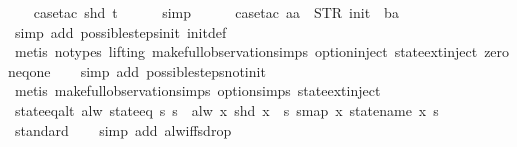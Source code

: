 \begin{isabellebody}
\ \ \isamarkupfalse%
\ {\isacharparenleft}case{\isacharunderscore}tac\ {\isachardoublequoteopen}shd\ t{\isachardoublequoteclose}{\isacharparenright}\isanewline
\ \ \ \ \isamarkupfalse%
\ simp\isanewline
\ \ \ \ \isamarkupfalse%
\ {\isacharparenleft}case{\isacharunderscore}tac\ {\isachardoublequoteopen}aa\ {\isacharequal}\ STR\ {\isacharprime}{\isacharprime}init{\isacharprime}{\isacharprime}\ {\isasymand}\ ba\ {\isacharequal}\ {\isacharbrackleft}{\isacharbrackright}{\isachardoublequoteclose}{\isacharparenright}\isanewline
\ \ \ \isamarkupfalse%
\ {\isacharparenleft}simp\ add{\isacharcolon}\ possible{\isacharunderscore}steps{\isacharunderscore}init\ init{\isacharunderscore}def{\isacharparenright}\isanewline
\ \ \isamarkupfalse%
\ {\isacharparenleft}metis\ {\isacharparenleft}no{\isacharunderscore}types{\isacharcomma}\ lifting{\isacharparenright}\ make{\isacharunderscore}full{\isacharunderscore}observation{\isachardot}simps{\isacharparenleft}{}{\isacharparenright}\ option{\isachardot}inject\ state{\isachardot}ext{\isacharunderscore}inject\ zero{\isacharunderscore}neq{\isacharunderscore}one{\isacharparenright}\isanewline
\ \ \isamarkupfalse%
\ {\isacharparenleft}simp\ add{\isacharcolon}\ possible{\isacharunderscore}steps{\isacharunderscore}not{\isacharunderscore}init{\isacharparenright}\isanewline
\ \ \isamarkupfalse%
\ {\isacharparenleft}metis\ make{\isacharunderscore}full{\isacharunderscore}observation{\isachardot}simps{\isacharparenleft}{}{\isacharparenright}\ option{\isachardot}simps{\isacharparenleft}{}{\isacharparenright}\ state{\isachardot}ext{\isacharunderscore}inject{\isacharparenright}%
\endisatagproof
{\isafoldproof}%
%
\isadelimproof
\isanewline
%
\endisadelimproof
\isanewline
{}\isamarkupfalse%
\ state{\isacharunderscore}eq{\isacharunderscore}alt{\isacharcolon}\ {\isachardoublequoteopen}alw\ {\isacharparenleft}state{\isacharunderscore}eq\ s{\isacharparenright}\ s{\isacharprime}\ {\isacharequal}\ alw\ {\isacharparenleft}{\isasymlambda}x{\isachardot}\ shd\ x\ {\isacharequal}\ s{\isacharparenright}\ {\isacharparenleft}smap\ {\isacharparenleft}{\isasymlambda}x{\isachardot}\ statename\ x{\isacharparenright}\ s{\isacharprime}{\isacharparenright}{\isachardoublequoteclose}\isanewline
%
\isadelimproof
\ \ %
\endisadelimproof
%
\isatagproof
{}\isamarkupfalse%
\ standard\isanewline
\ \ \isamarkupfalse%
\ {\isacharparenleft}simp\ add{\isacharcolon}\ alw{\isacharunderscore}iff{\isacharunderscore}sdrop{\isacharparenright}\isanewline

\end{isabellebody}

